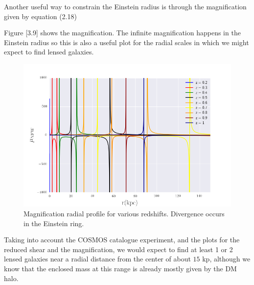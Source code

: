 Another useful way to constrain the Einstein radius is through the magnification given by equation (2.18)
 
Figure [3.9] shows the magnification. The infinite magnification happens in the Einstein radius so this is also a useful plot for the radial scales in which we might expect to find lensed galaxies.

\begin{figure}[H]
\centering
\includegraphics[width=12cm]{images/Magnification.png}
\caption[Magnification radial profile]{Magnification radial profile for various redshifts. Divergence occurs in the Einstein ring.}
\end{figure}

Taking into account the COSMOS catalogue experiment, and the plots for the reduced shear and the magnification, we would expect to find at least 1 or 2 lensed galaxies near a radial distance from the center of about $15$ kp, although we know that the enclosed mass at this range is already mostly given by the DM halo. 

